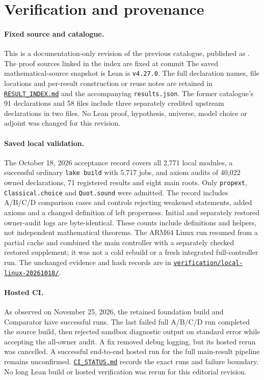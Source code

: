 \clearpage
\section{Verification and provenance}

\paragraph{Fixed source and catalogue.}
This is a documentation-only revision of the previous catalogue,
published as \texttt{\CatalogueTag}.
The proof sources linked in the index are fixed at commit
The saved mathematical-source snapshot is
Lean is \texttt{v4.27.0}.
The full declaration names, file locations and per-result construction or reuse notes are retained in
\href{\Repo/blob/\CatalogueTag/docs/formalization-companion/RESULT_INDEX.md}{\texttt{RESULT\_INDEX.md}}
and the accompanying \texttt{results.json}.
The former catalogue's 91 declarations and 58 files include three separately credited upstream declarations in two files.
No Lean proof, hypothesis, universe, model choice or adjoint was changed for this revision.

\paragraph{Saved local validation.}
The October 18, 2026 acceptance record covers all 2,771 local modules,
a successful ordinary \texttt{lake build} with 5,717 jobs,
and axiom audits of 40,022 owned declarations, 71 registered results and eight main roots.
Only \texttt{propext}, \texttt{Classical.choice} and \texttt{Quot.sound} were admitted.
The record includes A/B/C/D comparison cases and controls rejecting weakened statements,
added axioms and a changed definition of left properness.
Initial and separately restored owner-audit logs are byte-identical.
These counts include definitions and helpers, not independent mathematical theorems.
The ARM64 Linux run resumed from a partial cache and combined the main controller with a separately checked restored supplement;
it was not a cold rebuild or a fresh integrated full-controller run.
The unchanged evidence and hash records are in
\href{\Repo/tree/\CatalogueTag/verification/local-linux-20261018}{\texttt{verification/local-linux-20261018/}}.

\paragraph{Hosted CI.}
As observed on November 25, 2026,
the retained foundation build and Comparator have successful runs.
The last failed full A/B/C/D run completed the source build,
then rejected sandbox diagnostic output on standard error while accepting the all-owner audit.
A fix removed debug logging, but its hosted rerun was cancelled.
A successful end-to-end hosted run for the full main-result pipeline remains unconfirmed.
\href{\Repo/blob/\CatalogueTag/CI_STATUS.md}{\texttt{CI\_STATUS.md}} records the exact runs and failure boundary.
No long Lean build or hosted verification was rerun for this editorial revision.

